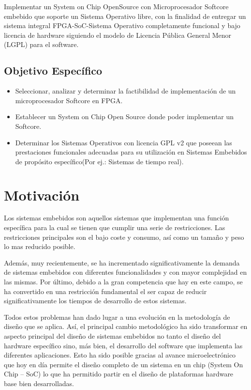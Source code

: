 Implementar un System on Chip OpenSource con Microprocesador Softcore embebido que soporte un Sistema Operativo libre, con la finalidad de entregar
un sistema integral FPGA-SoC-Sistema Operativo completamente funcional y bajo licencia de hardware siguiendo el modelo de Licencia Pública General Menor (LGPL) para el software.


\subsection{Objetivo Específico}
\begin{itemize}
\item Seleccionar, analizar y determinar la factibilidad de implementación de un microprocesador Softcore en FPGA.
\item Establecer un System on Chip Open Source donde poder implementar un Softcore.
\item Determinar los Sistemas Operativos con licencia GPL v2 que poseean las prestaciones funcionales adecuadas para su utilización en Sistemas
Embebidos de propósito específico(Por ej.: Sistemas de tiempo real).
\end{itemize}

\section{Motivación} 

Los sistemas embebidos son aquellos sistemas que implementan una función específica para la cual se  tienen que cumplir una serie de restricciones. Las  restricciones principales son el bajo coste y consumo, así  como un tamaño y peso lo mas reducido posible.
 
Además, muy recientemente, se ha incrementado  significativamente la demanda de sistemas embebidos con diferentes funcionalidades y con mayor complejidad  en las mismas. Por último, debido a la gran competencia  que hay en este campo, se ha convertido en una restricción fundamental el ser capaz de reducir significativamente los tiempos de desarrollo de estos sistemas.

Todos estos problemas han dado lugar a una evolución en la metodología de diseño que se aplica. Así, el principal cambio metodológico ha sido transformar en 
aspecto principal del diseño de sistemas embebidos no tanto el diseño del hardware específico sino, más bien, el desarrollo del software que implementa las diferentes 
aplicaciones. Esto ha sido posible gracias al avance microelectrónico que hoy en día permite el diseño completo de un sistema en un chip (System On Chip – SoC) lo que ha permitido partir en el diseño de plataformas hardware base bien desarrolladas. 

